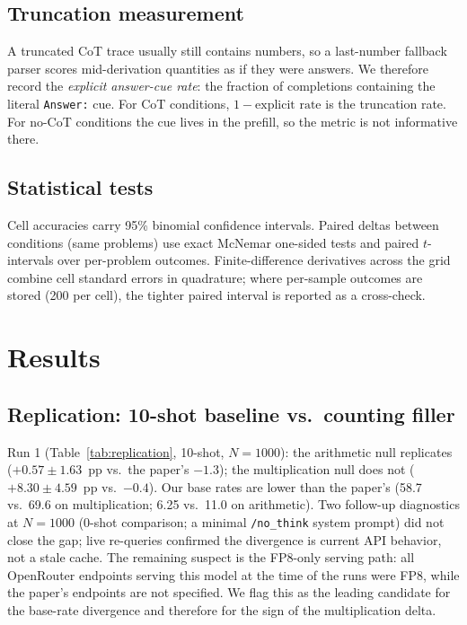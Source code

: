 \documentclass[11pt,a4paper]{article}
\begin{document}
\subsection{Truncation measurement}
\label{sec:trunc}
A truncated CoT trace usually still contains numbers, so a last-number
fallback parser scores mid-derivation quantities as if they were answers. We
therefore record the \emph{explicit answer-cue rate}: the fraction of
completions containing the literal \texttt{Answer:} cue. For CoT conditions,
$1 - \text{explicit rate}$ is the truncation rate. For no-CoT conditions the
cue lives in the prefill, so the metric is not informative there.

\subsection{Statistical tests}
Cell accuracies carry 95\% binomial confidence intervals. Paired deltas
between conditions (same problems) use exact McNemar one-sided tests and
paired $t$-intervals over per-problem outcomes. Finite-difference derivatives
across the grid combine cell standard errors in quadrature; where per-sample
outcomes are stored (200 per cell), the tighter paired interval is reported
as a cross-check.

\section{Results}
\label{sec:results}

\subsection{Replication: 10-shot baseline vs.\ counting filler}
\label{sec:replication}

Run 1 (Table~\ref{tab:replication}, 10-shot, $N{=}1000$): the arithmetic null
replicates ($+0.57 \pm 1.63$~pp vs.\ the paper's $-1.3$); the multiplication
null does not ($+8.30 \pm 4.59$~pp vs.\ $-0.4$). Our base rates are lower than
the paper's (58.7 vs.\ 69.6 on multiplication; 6.25 vs.\ 11.0 on arithmetic).
Two follow-up diagnostics at $N{=}1000$ (0-shot comparison; a minimal
\texttt{/no\_think} system prompt) did not close the gap; live re-queries
confirmed the divergence is current API behavior, not a stale cache. The
remaining suspect is the FP8-only serving path: all OpenRouter endpoints
serving this model at the time of the runs were FP8, while the paper's
endpoints are not specified. We flag this as the leading candidate for the
base-rate divergence and therefore for the sign of the multiplication delta.
\end{document}
